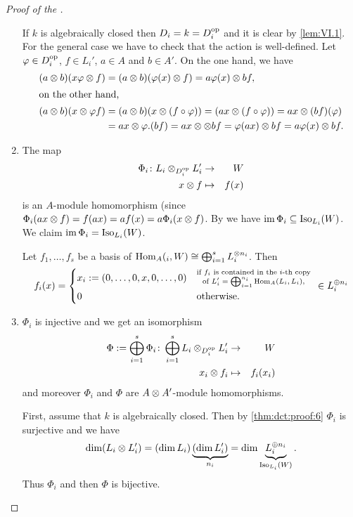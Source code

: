 \documentclass[12pt,a4paper]{scrartcl}
\theoremstyle{cplain}
\theoremstyle{cplain}
\theoremstyle{cplain}
\theoremstyle{definition}
\begin{document}
\begin{otherlanguage}{english}
\begin{proof}[Proof of the ]
\begin{enumerate}[label=\arabic*.]
    If $k$ is algebraically closed then $D_i = k = D_i^{\operatorname{op}}$ and it is clear by \cref{lem:VI.1}. For the general case we have to check that the action is well-defined. Let $\varphi\in D_i^{\operatorname{op}}$, $f\in L_i'$, $a\in A$ and $b\in A'$. On the one hand, we have
    \begin{align*}
      (a\otimes b)(x\varphi \otimes f) &= (a\otimes b) (\varphi(x)\otimes f) = a\varphi(x) \otimes bf, \\
      \intertext{on the other hand, }
      (a\otimes b)(x\otimes \varphi f) &= (a\otimes b)(x\otimes (f\circ\varphi)) = (ax \otimes (f\circ\varphi)) = ax \otimes (bf)(\varphi) \\ &= ax \otimes \varphi . (bf) = ax\otimes \otimes bf = \varphi(ax) \otimes bf = a\varphi(x) \otimes bf.
    \end{align*}
    \item \label{thm:dct:proof:6} The map %
    \begin{eqnarray*}
      \Phi_i\colon L_i \otimes_{D_i^{\operatorname{op}}}L_i' &\to& W \\
      x \otimes f &\mapsto& f(x)
    \end{eqnarray*}
    is an $A$-module homomorphism (since $\Phi_i(ax\otimes f) = f(ax) = af(x) = a\Phi_i(x\otimes f)$. By  we have $\operatorname{im} \Phi_i \subseteq \operatorname{Iso}_{L_i}(W)$. We claim $\operatorname{im} \Phi_i = \operatorname{Iso}_{L_i}(W)$.
    
    Let $f_1,\ldots,f_s$ be a basis of $\operatorname{Hom}_A(_i,W) \cong \bigoplus_{i=1}^s L_i^{\otimes n_i}$. Then
    \begin{align*}
      f_i(x) = \begin{cases*} x_i := (0,\ldots,0,x,0,\ldots,0)  & $\substack{\text{if $f_i$ is contained in the $i$-th copy}\\\text{of $L_i' = \bigoplus_{i=1}^{n_i}\Hom_A(L_i,L_i)$,}}$ \\ 0 & otherwise. \end{cases*} \in L_i^{\oplus n_i}
    \end{align*}
    \item \label{thm:dct:proof:7} $\Phi_i$ is injective and we get an isomorphism \begin{eqnarray*} \Phi := \bigoplus_{i=1}^s\Phi_i\colon \bigoplus_{i=1}^sL_i\otimes_{D_i^{\operatorname{op}}}L_i' &\to& W \\ x_i \otimes f_i &\mapsto& f_i(x_i) \end{eqnarray*} and moreover $\Phi_i$ and $\Phi$ are $A\otimes A'$-module homomorphisms.
    
    First, assume that $k$ is algebraically closed. Then by \ref{thm:dct:proof:6} $\Phi_i$ is surjective and we have \[ \dim(L_i \otimes L_i') = (\dim L_i)\underbrace{(\dim L_i')}_{n_i} = \dim \underbrace{L_i^{\oplus n_i}}_{\operatorname{Iso}_{L_i}(W)}. \]
    Thus $\Phi_i$ and then $\Phi$ is bijective.
    

\end{enumerate}
\end{proof}
\end{otherlanguage}
\end{document}

